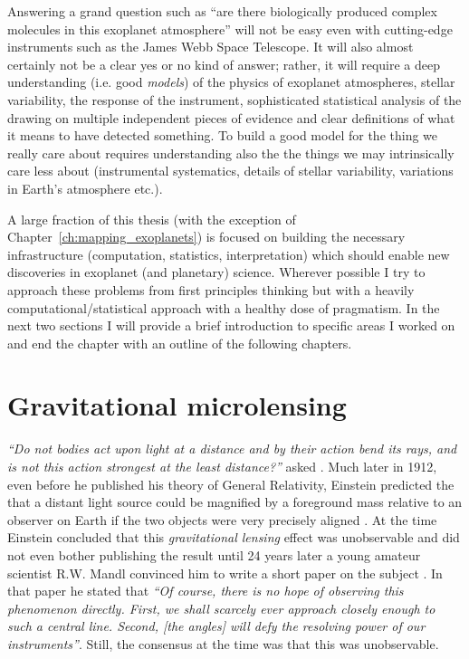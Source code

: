 \documentclass[11pt]{report}
\begin{document}
Answering a grand question such as ``are there biologically produced complex
molecules in this exoplanet atmosphere'' will not be easy even with
cutting-edge instruments such as the James Webb Space Telescope. It will also
almost certainly not be a clear yes or no kind of answer; rather, it will
require a deep understanding (i.e. good \emph{models}) of the physics of
exoplanet atmospheres, stellar variability, the response of the instrument,
sophisticated statistical analysis of the drawing on multiple independent
pieces of evidence and clear definitions of what it means to have detected
something. To build a good model for the thing we really care about requires
understanding also the the things we may intrinsically care less about
(instrumental systematics, details of stellar variability, variations in
Earth's atmosphere etc.).

A large fraction of this thesis (with the exception of
Chapter~\ref{ch:mapping_exoplanets}) is focused on building the necessary
infrastructure (computation, statistics, interpretation) which should enable
new discoveries in exoplanet (and planetary) science. Wherever possible I try
to approach these problems from first principles thinking but with a heavily
computational/statistical approach with a healthy dose of pragmatism. In the
next two sections I will provide a brief introduction to specific areas I
worked on and end the chapter with an outline of the following chapters.

\section{Gravitational microlensing}
\emph{``Do not bodies act upon light at a distance and by their action bend its rays,
    and is not this action strongest at the least distance?''} asked \citet{Newton1704}.
Much later in 1912, even before he published his theory of General Relativity, Einstein
predicted the that a distant light source could be magnified by a foreground mass
relative to an observer on Earth if the two objects were very precisely aligned
\citep{Renn1997}.
At the time Einstein concluded that this \emph{gravitational lensing} effect was
unobservable and did not even bother
publishing the result until 24 years later a young amateur scientist R.W. Mandl convinced
him to write a short paper on the subject \citep{1936Sci....84..506E}.
In that paper he
stated that \emph{``Of course, there is no hope of observing this phenomenon directly.
    First, we shall scarcely ever approach closely enough to such a central line.
    Second, [the angles] will defy the resolving power of our instruments''}.
Still, the consensus at the time was that this was unobservable.
\end{document}
